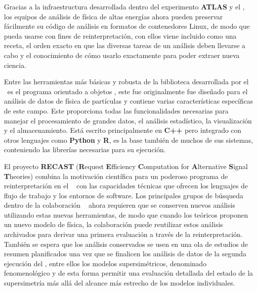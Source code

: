 
Gracias a la infraestructura desarrollada dentro del experimento \textbf{ATLAS} y el \CERN, los equipos de análisis de física de altas energías ahora pueden preservar fácilmente su código de análisis en formatos de contenedores Linux, de modo que pueda usarse con fines de reinterpretación, con ellos viene incluido como una receta, el orden exacto en que las diversas tareas de un análisis deben llevarse a cabo y el conocimiento de cómo usarlo exactamente para poder extraer nueva ciencia.

Entre las herramientas más básicas y robusta de la biblioteca desarrollada por el \CERN ~es el programa orientado a objetos \ROOT, este fue originalmente fue diseñado para el análisis de datos de física de partículas y contiene varias características específicas de este campo. Este proporciona todas las funcionalidades necesarias para manejar el procesamiento de grandes datos, el análisis estadístico, la visualización y el almacenamiento. Está escrito principalmente en \textbf{C++} pero integrado con otros lenguajes como \textbf{Python} y \textbf{R}, es la base también de muchos de sus sistemas, conteniendo las librerías necesarias para su ejecución.

El proyecto \textbf{RECAST} (\textbf{R}equest \textbf{E}fficiency \textbf{C}omputation for \textbf{A}lternative \textbf{S}ignal \textbf{T}heo\-ries) combina la motivación científica para un poderoso programa de reinterpretación en el \LHC ~ con las capacidades técnicas que ofrecen los lenguajes de flujo de trabajo y los entornos de software. Los principales grupos de búsqueda dentro de la colaboración \LHC~ ahora requieren que se conserven nuevos análisis utilizando estas nuevas herramientas, de modo que cuando los teóricos proponen un nuevo modelo de física, la colaboración puede reutilizar estos análisis archivados para derivar una primera evaluación a través de la reinterpretación. También se espera que los análisis conservados se usen en una ola de estudios de resumen planificados una vez que se finalicen los análisis de datos de la segunda ejecución del \LHC, entre ellos los modelos supersimétricos, denominado \MSSM ~ fenomenológico y de esta forma permitir una evaluación detallada del estado de la supersimetría más allá del alcance más estrecho de los modelos individuales. 


